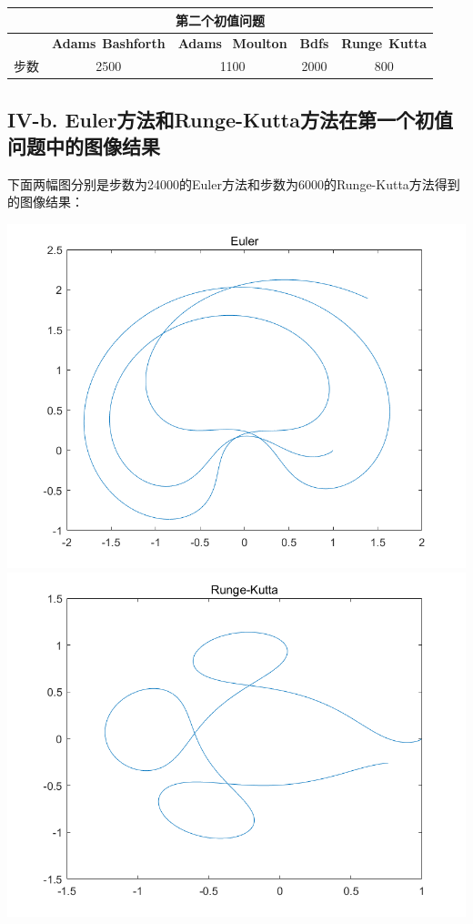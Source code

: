 \documentclass[twoside,a4paper]{article}
\begin{document}
\centering
\renewcommand{\arraystretch}{1.5}
\begin{tabular}{|c|c|c|c|c|}
    \multicolumn{5}{c}{\textbf{第二个初值问题}}                                                                                    \\
    \hline
         & \textbf{Adams}\ \textbf{Bashforth} & \textbf{Adams} \ \textbf{Moulton} & \textbf{Bdfs} & \textbf{Runge}\ \textbf{Kutta} \\
    \hline
    步数 & 2500                               & 1100                              & 2000          & 800                            \\
    \hline
\end{tabular}

\raggedright
\subsection*{IV-b. Euler方法和Runge-Kutta方法在第一个初值问题中的图像结果}
\hspace{0.8em}
下面两幅图分别是步数为24000的Euler方法和步数为6000的Runge-Kutta方法得到的图像结果：

\centering
\includegraphics[scale=0.6]{../png/Euler.png}
\includegraphics[scale=0.6]{../png/Runge-Kutta.png}
\end{document}

